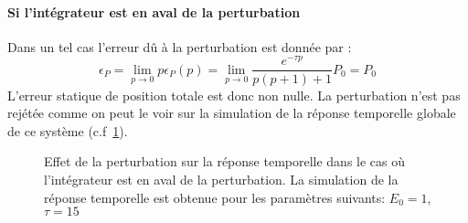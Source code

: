 \paragraph{Si l'intégrateur est en aval de la perturbation}
Dans un tel cas l'erreur dû à la perturbation est donnée par :
$$
\epsilon_P=\lim\limits_{p\to0}p\epsilon_P(p)=
\lim\limits_{p\to0}\dfrac{e^{-\tau p}}{p(p+1)+1}P_0=P_0
$$
L'erreur statique de position totale est donc non nulle. La perturbation
n'est pas rejétée comme on peut le voir sur la simulation de la réponse
temporelle globale de ce système (c.f~\cref{fig-pert1}).
\begin{figure}[!h]
\centering
{}
\caption{Effet de la perturbation sur la réponse temporelle dans le cas
         où l'intégrateur est en aval de la perturbation. La simulation 
         de la réponse temporelle est obtenue pour les paramètres suivants:
         $E_0=1$, $\tau=15$\label{fig-pert1}}
\end{figure}
